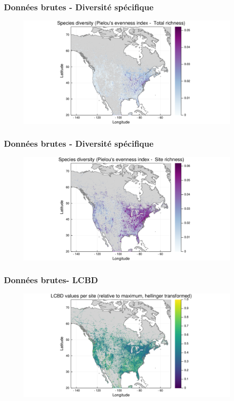 \documentclass[10pt]{beamer}
\begin{document}
\begin{frame}
  \frametitle{Données brutes - Diversité spécifique}
  \begin{figure}
    \centering
    \hspace*{-2cm}\includegraphics[scale=0.5]{../fig/raw/raw-diversity-pielou2.pdf}
  \end{figure}
\end{frame}

\begin{frame}
  \frametitle{Données brutes - Diversité spécifique}
  \begin{figure}
    \centering
    \hspace*{-2cm}\includegraphics[scale=0.5]{../fig/raw/raw-diversity-pielou.pdf}
  \end{figure}
\end{frame}

\begin{frame}
  \frametitle{Données brutes- LCBD}
  \begin{figure}
    \centering
    \hspace*{-2cm}\includegraphics[scale=0.5]{../fig/raw/raw-lcbd-transf.pdf}
  \end{figure}
\end{frame}
\end{document}
